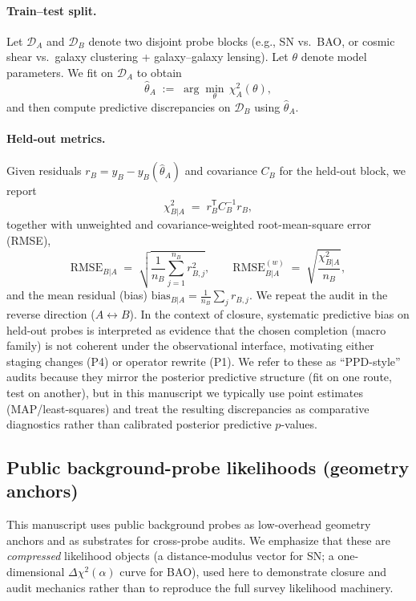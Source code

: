\documentclass[11pt]{article}
\theoremstyle{definition}
\theoremstyle{plain}
\theoremstyle{remark}
\begin{document}
\paragraph{Train--test split.}
Let $\mathcal{D}_A$ and $\mathcal{D}_B$ denote two disjoint probe blocks (e.g., SN vs.\ BAO, or cosmic shear vs.\ galaxy clustering + galaxy--galaxy lensing).
Let $\theta$ denote model parameters. We fit on $\mathcal{D}_A$ to obtain
\begin{equation}
\hat\theta_A \;:=\; \arg\min_{\theta}\,\chi^2_A(\theta),
\label{eq:theta_hat_train}
\end{equation}
and then compute predictive discrepancies on $\mathcal{D}_B$ using $\hat\theta_A$.

\paragraph{Held-out metrics.}
Given residuals $r_B = y_B - y_B(\hat\theta_A)$ and covariance $C_B$ for the held-out block, we report
\begin{equation}
\chi^2_{B|A} \;=\; r_B^{\mathsf T}C_B^{-1}r_B,
\label{eq:chi2_test}
\end{equation}
together with unweighted and covariance-weighted root-mean-square error (RMSE),
\begin{equation}
\mathrm{RMSE}_{B|A} \;=\; \sqrt{\frac{1}{n_B}\sum_{j=1}^{n_B} r_{B,j}^2},
\qquad
\mathrm{RMSE}^{(w)}_{B|A} \;=\; \sqrt{\frac{\chi^2_{B|A}}{n_B}},
\label{eq:rmse_defs}
\end{equation}
and the mean residual (bias) $\mathrm{bias}_{B|A}=\frac{1}{n_B}\sum_j r_{B,j}$.
We repeat the audit in the reverse direction ($A\leftrightarrow B$).
In the context of closure, systematic predictive bias on held-out probes is interpreted as evidence that the chosen completion (macro family) is not coherent under the observational interface, motivating either staging changes (P4) or operator rewrite (P1).
We refer to these as ``PPD-style'' audits because they mirror the posterior predictive structure (fit on one route, test on another), but in this manuscript we typically use point estimates (MAP/least-squares) and treat the resulting discrepancies as comparative diagnostics rather than calibrated posterior predictive $p$-values.

\subsection{Public background-probe likelihoods (geometry anchors)}\label{sec:methods:background_likes}
This manuscript uses public background probes as low-overhead geometry anchors and as substrates for cross-probe audits.
We emphasize that these are \emph{compressed} likelihood objects (a distance-modulus vector for SN; a one-dimensional $\Delta\chi^2(\alpha)$ curve for BAO), used here to demonstrate closure and audit mechanics rather than to reproduce the full survey likelihood machinery.
\end{document}

